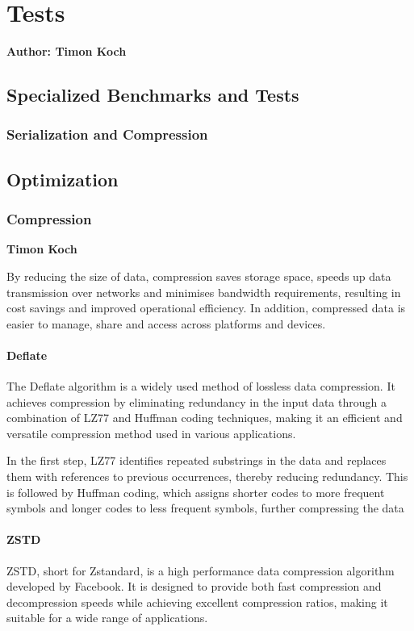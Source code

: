 \chapter{Tests}

\textbf{Author: Timon Koch}

\section{Specialized Benchmarks and Tests}
\subsection{Serialization and Compression}

\section{Optimization}
\subsection{Compression}
\textbf{Timon Koch}

By reducing the size of data, compression saves storage space, speeds up data transmission over networks and minimises bandwidth requirements, resulting in cost savings and improved operational efficiency. In addition, compressed data is easier to manage, share and access across platforms and devices. 

\subsubsection{Deflate}
The Deflate algorithm is a widely used method of lossless data compression. It achieves compression by eliminating redundancy in the input data through a combination of LZ77 and Huffman coding techniques, making it an efficient and versatile compression method used in various applications.

In the first step, LZ77 identifies repeated substrings in the data and replaces them with references to previous occurrences, thereby reducing redundancy. This is followed by Huffman coding, which assigns shorter codes to more frequent symbols and longer codes to less frequent symbols, further compressing the data

\subsubsection{ZSTD}
ZSTD, short for Zstandard, is a high performance data compression algorithm developed by Facebook. It is designed to provide both fast compression and decompression speeds while achieving excellent compression ratios, making it suitable for a wide range of applications.

